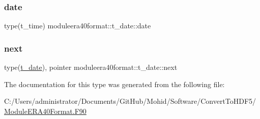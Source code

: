 \subsubsection{\texorpdfstring{date}{date}}
{\footnotesize\ttfamily type(t\+\_\+time) moduleera40format\+::t\+\_\+date\+::date\hspace{0.3cm}{\ttfamily [private]}}

\mbox{\label{structmoduleera40format_1_1t__date_a288e01c1e9bce096bd97acc8cdb495d7}} 
\subsubsection{\texorpdfstring{next}{next}}
{\footnotesize\ttfamily type(\mbox{\hyperlink{structmoduleera40format_1_1t__date}{t\+\_\+date}}), pointer moduleera40format\+::t\+\_\+date\+::next\hspace{0.3cm}{\ttfamily [private]}}



The documentation for this type was generated from the following file\+:\begin{DoxyCompactItemize}
\item 
C\+:/\+Users/administrator/\+Documents/\+Git\+Hub/\+Mohid/\+Software/\+Convert\+To\+H\+D\+F5/\mbox{\hyperlink{_module_e_r_a40_format_8_f90}{Module\+E\+R\+A40\+Format.\+F90}}\end{DoxyCompactItemize}
